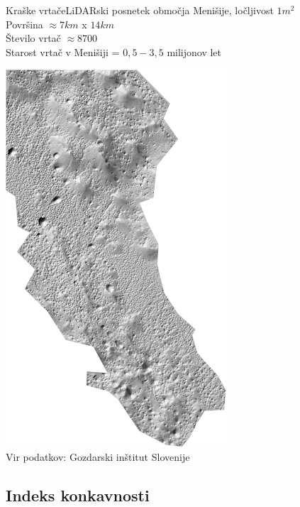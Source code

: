 \documentclass{beamer}
\begin{document}
\begin{frame}{Kraške vrtače}{LiDARski posnetek območja Menišije, ločljivost $1m^2$ \\ Površina $\approx 7 km$ x $14 km$ \\ Število vrtač $\approx 8700$ \\ Starost vrtač v Menišiji = $0,5 - 3,5$ milijonov let}
\begin{center}
  \hspace*{-1cm}\includegraphics[width=0.62\textwidth,angle=90]{slike/menisija-relief}
  \tiny{\\Vir podatkov: Gozdarski inštitut Slovenije}
\end{center}
\end{frame}

\subsection{Indeks konkavnosti}
\end{document}

